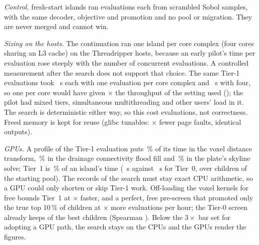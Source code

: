 \emph{Control.} \gControlIslands{} fresh-start islands ran \gControlEvals{} evaluations each from scrambled Sobol samples, with the
same decoder, objective and promotion and no pool or migration. They are never merged and cannot win.

\emph{Sizing on the hosts.} The continuation ran one island per core complex (four cores sharing an L3 cache) on the
Threadripper hosts, because an early pilot's time per evaluation rose steeply with the number of concurrent evaluations. A
controlled measurement after the search does not support that choice. The same \gSizingGenomes{} Tier-1 evaluations took
\gSizingOneS~s each with one evaluation per core complex and \gSizingFourS~s with four, so one per core would have given
\gSizingGain$\times$ the throughput of the setting used (); the pilot had mixed tiers, simultaneous
multithreading and other users' load in it. The search is deterministic either way, so this cost evaluations, not correctness.
Freed memory is kept for reuse (glibc tunables: \gSizingFaultRatio$\times$ fewer page faults, identical outputs).

\emph{GPUs.} A profile of the Tier-1 evaluation puts \gSpikeEdtPct\,\% of its time in the voxel distance transform, \gSpikeConnPct\,\%
in the drainage connectivity flood fill and \gSpikePlatePct\,\% in the plate's skyline solve; Tier~1 is \gSpikeTierOneShare\,\% of an
island's time (\gSpikeTierOneS~s against \gSpikeTierZeroS~s for Tier~0, over \gSpikeChildren{} children of the starting pool). The
records of the search must stay exact CPU arithmetic, so a GPU could only shorten or skip Tier-1 work. Off-loading the voxel kernels
for free bounds Tier~1 at \gSpikeKernelBound$\times$ faster, and a perfect, free pre-screen that promoted only the true top 10\,\% of
children at \gSpikeScreenBound$\times$ more evaluations per hour; the Tier-0 screen already keeps \gSpikeKept{} of the \gSpikeTopTen{}
best children (Spearman \gSpikeSpearman). Below the $3\times$ bar set for adopting a GPU path, the search stays on the CPUs and the
GPUs render the figures.
